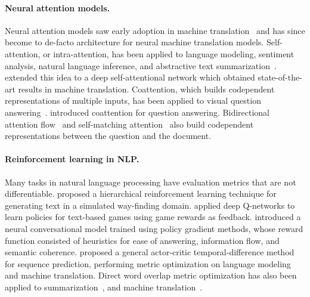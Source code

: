 \documentclass{article} %
\begin{document}
\paragraph{Neural attention models.}
Neural attention models saw early adoption in machine translation~\citep{bahdanau2014neural} and has since become to de-facto architecture for neural machine translation models.
Self-attention, or intra-attention, has been applied to language modeling, sentiment analysis, natural language inference, and abstractive text summarization~\citep{Chen2017ReadingWT,Paulus2017ADR}.
\citet{Vaswani2017AttentionIA} extended this idea to a deep self-attentional network which obtained state-of-the-art results in machine translation.
Coattention, which builds codependent representations of multiple inputs, has been applied to visual question answering~\citep{Lu2016HierarchicalQC}.
\citet{xiong2016dynamic} introduced coattention for question answering.
Bidirectional attention flow~\citep{Seo2016BidirectionalAF} and self-matching attention~\citep{rnet} also build codependent representations between the question and the document.


\paragraph{Reinforcement learning in NLP.}
Many tasks in natural language processing have evaluation metrics that are not differentiable.
\citet{dethlefs2011combining} proposed a hierarchical reinforcement learning technique for generating text in a simulated way-finding domain.
\citet{Narasimhan2015LanguageUF} applied deep Q-networks to learn policies for text-based games using game rewards as feedback.
\citet{li2016deep} introduced a neural conversational model trained using policy gradient methods, whose reward function consisted of heuristics for ease of answering, information flow, and semantic coherence.
\citet{Bahdanau2016AnAA} proposed a general actor-critic temporal-difference method for sequence prediction, performing metric optimization on language modeling and machine translation.
Direct word overlap metric optimization has also been applied to summarization~\citep{Paulus2017ADR}, and machine translation~\citep{wu2016google}.
\end{document}
